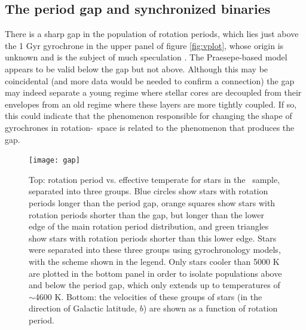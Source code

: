 \subsection{The period gap and synchronized binaries}
\label{sec:gap}

There is a sharp gap in the population of rotation periods, which lies just
above the 1 Gyr gyrochrone in the upper panel of figure \ref{fig:vplot}, whose
origin is unknown and is the subject of much speculation \citep{mcquillan2014,
davenport2018, reinhold2019}.
The Praesepe-based model appears to be valid below the gap but not above.
Although this may be coincidental (and more data would be needed to confirm a
connection) the gap may indeed separate a young regime where stellar cores are
decoupled from their envelopes from an old regime where these layers are more
tightly coupled.
If so, this could indicate that the phenomenon responsible for changing the
shape of gyrochrones in rotation-\teff\ space is related to the phenomenon that
produces the gap.

\begin{figure}
  \caption{
      Top: rotation period vs. effective temperate for stars in the \mct\
    sample, separated into three groups. Blue circles
      show stars with rotation periods longer than the
    period gap, orange squares show stars with rotation periods shorter than
    the gap, but longer than the lower edge of the main rotation period
    distribution, and green triangles show stars with rotation periods shorter
    than this lower edge.
    Stars were separated into these three groups using \citet{angus2019}
    gyrochronology models, with the scheme shown in the legend.
    Only stars cooler than 5000 K are plotted in
    the bottom panel in order to isolate populations above and below the
    period gap, which only extends up to temperatures of $\sim$4600 K.
    Bottom: the velocities of these groups of stars (in the direction of
    Galactic latitude, $b$) are shown as a function of rotation period.
}
  \centering
    \texttt{[image: gap]}
\label{fig:gap}
\end{figure}

